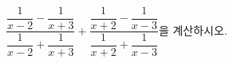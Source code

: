 $\dfrac{\dfrac{1}{x-2}-\dfrac{1}{x+3}}{\dfrac{1}{x-2}+\dfrac{1}{x+3}}+\dfrac{\dfrac{1}{x+2}-\dfrac{1}{x-3}}{\dfrac{1}{x+2}+\dfrac{1}{x-3}}$을 계산하시오.
